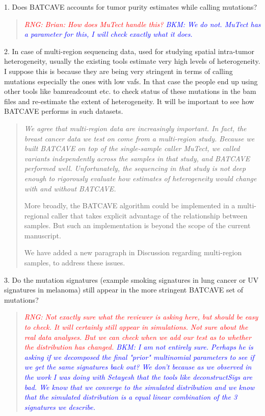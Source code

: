 \documentclass[11pt]{article}
\newcommand{\BKM}[1]{\textcolor{blue}{BKM: #1}}
\newcommand{\RNG}[1]{\textcolor{red}{RNG: #1}}
\newenvironment{response}
{\begin{quote}\itshape}
{\end{quote}}
\begin{document}
1. Does BATCAVE accounts for tumor purity estimates while calling mutations?
\begin{response}
\RNG{Brian: How does MuTect handle this?}
\BKM{We do not. MuTect has a parameter for this, I will check exactly what it does.}
\end{response}

2. In case of multi-region sequencing data, used for studying spatial intra-tumor heterogeneity, usually the existing tools estimate very high levels of heterogeneity. I suppose this is because they are being very stringent in terms of calling mutations especially the ones with low vafs. In that case the people end up using other tools like bamreadcount etc. to check status of these mutations in the bam files and re-estimate the extent of heterogeneity. It will be important to see how BATCAVE performs in such datasets.
\begin{response}
We agree that multi-region data are increasingly important.
In fact, the breast cancer data we test on come from a multi-region study. 
Because we built BATCAVE on top of the single-sample caller MuTect, we called variants independently across the samples in that study, and BATCAVE performed well.
Unfortunately, the sequencing in that study is not deep enough to rigorously evaluate how estimates of heterogeneity would change with and without BATCAVE.

More broadly, the BATCAVE algorithm could be implemented in a multi-regional caller that takes explicit advantage of the relationship between samples.
But such an implementation is beyond the scope of the current manuscript.

We have added a new paragraph in Discussion regarding multi-region samples, to address these issues.
\end{response}

3. Do the mutation signatures (example smoking signatures in lung cancer or UV signatures in melanoma) still appear in the more stringent BATCAVE set of mutations?
\begin{response}
\RNG{Not exactly sure what the reviewer is asking here, but should be easy to check. It will certainly still appear in simulations. Not sure about the real data analyses. But we can check when we add our test as to whether the distribution has changed.}
\BKM{I am not entirely sure. Perhaps he is asking if we decomposed the final "prior" multinomial parameters to see if we get the same signatures back out? We don't because as we observed in the work I was doing with Setayesh that the tools like deconstructSigs are bad. We know that we converge to the simulated distribution and we know that the simulated distribution is a equal linear combination of the 3 signatures we describe.}
\end{response}
\end{document}
